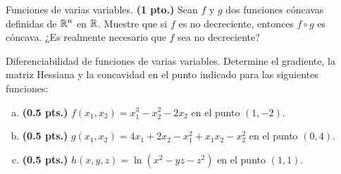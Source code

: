 \begin{problema}{Funciones de varias variables.}
	\textbf{(1 pto.)} Sean $f$ y $g$ dos funciones cóncavas definidas de $\mathbb{R}^n$ en $\mathbb{R}$. Muestre que si $f$ es no decreciente, entonces $f \circ g$ es cóncava. ¿Es realmente necesario que $f$ sea no decreciente? 
\end{problema}

\begin{problema}{Diferenciabilidad de funciones de varias variables.}
	Determine el gradiente, la matriz Hessiana y la concavidad en el punto indicado para las siguientes funciones: 
	
	\begin{enumerate}[(a)]
		\item \textbf{(0.5 pts.)} $f(x_1, x_2) = x_1^3 - x_2^2 - 2x_2$ en el punto $(1, -2)$. 
		\item \textbf{(0.5 pts.)} $g(x_1, x_2) = 4x_1 + 2x_2 - x_1^2 + x_1 x_2 - x_2^2$ en el punto $(0, 4)$.
		\item \textbf{(0.5 pts.)} $h(x,y,z) = \ln(x^2 - y z - z^2)$ en el punto $(1, 1)$. 
	\end{enumerate}
\end{problema}